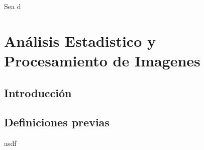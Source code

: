 Sea d%
\chapter{Análisis Estadistico y Procesamiento de Imagenes }\label{chap5}

\section{Introducci\'on}


\section{Definiciones previas}

asdf